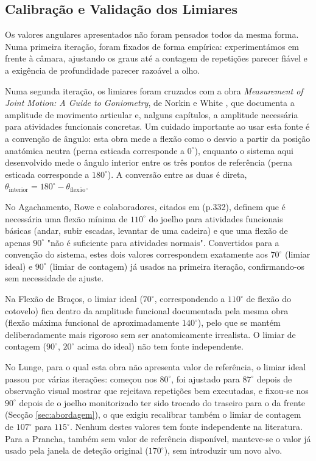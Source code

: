 \subsection{Calibração e Validação dos Limiares}
\label{sec:calibracaoLimiares}

Os valores angulares apresentados não foram pensados todos da mesma forma. Numa primeira iteração, foram fixados de forma empírica: experimentámos em frente à câmara, ajustando os graus até a contagem de repetições parecer fiável e a exigência de profundidade parecer razoável a olho.

Numa segunda iteração, os limiares foram cruzados com a obra \textit{Measurement of Joint Motion: A Guide to Goniometry}, de Norkin e White \cite{Norkin_White_2016}, que documenta a amplitude de movimento articular e, nalguns capítulos, a amplitude necessária para atividades funcionais concretas. Um cuidado importante ao usar esta fonte é a convenção de ângulo: esta obra mede a flexão como o desvio a partir da posição anatómica neutra (perna esticada corresponde a $0^\circ$), enquanto o sistema aqui desenvolvido mede o ângulo interior entre os três pontos de referência (perna esticada corresponde a $180^\circ$). A conversão entre as duas é direta, $\theta_{\text{interior}} = 180^\circ - \theta_{\text{flexão}}$.

No Agachamento, Rowe e colaboradores, citados em \cite{Norkin_White_2016} (p.332), definem que é necessária uma flexão mínima de $110^\circ$ do joelho para atividades funcionais básicas (andar, subir escadas, levantar de uma cadeira) e que uma flexão de apenas $90^\circ$ "não é suficiente para atividades normais". Convertidos para a convenção do sistema, estes dois valores correspondem exatamente aos $70^\circ$ (limiar ideal) e $90^\circ$ (limiar de contagem) já usados na primeira iteração, confirmando-os sem necessidade de ajuste.

Na Flexão de Braços, o limiar ideal ($70^\circ$, correspondendo a $110^\circ$ de flexão do cotovelo) fica dentro da amplitude funcional documentada pela mesma obra (flexão máxima funcional de aproximadamente $140^\circ$), pelo que se mantém deliberadamente mais rigoroso sem ser anatomicamente irrealista. O limiar de contagem ($90^\circ$, $20^\circ$ acima do ideal) não tem fonte independente.

No Lunge, para o qual esta obra não apresenta valor de referência, o limiar ideal passou por várias iterações: começou nos $80^\circ$, foi ajustado para $87^\circ$ depois de observação visual mostrar que rejeitava repetições bem executadas, e fixou-se nos $90^\circ$ depois de o joelho monitorizado ter sido trocado do traseiro para o da frente (Secção \ref{sec:abordagem}), o que exigiu recalibrar também o limiar de contagem de $107^\circ$ para $115^\circ$. Nenhum destes valores tem fonte independente na literatura. Para a Prancha, também sem valor de referência disponível, manteve-se o valor já usado pela janela de deteção original ($170^\circ$), sem introduzir um novo alvo.


